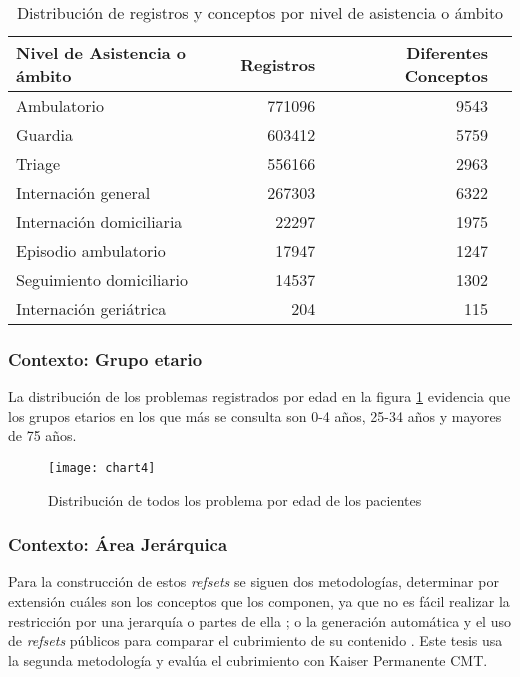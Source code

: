 \begin{table}[tb]
\centering
\caption{Distribución de registros y conceptos por nivel de asistencia o ámbito }
\label{nivel_asistencia}
\begin{tabular}{@{}lrrr@{}}
\toprule
Nivel de Asistencia o ámbito & Registros & Diferentes Conceptos \\ \midrule
Ambulatorio & \num{771096} & \num{9543} \\
Guardia & \num{603412} & \num{5759} \\
Triage & \num{556166} & \num{2963} \\
Internación general & \num{267303} & \num{6322} \\
Internación domiciliaria & \num{22297} & \num{1975}\\
Episodio ambulatorio & \num{17947} & \num{1247} \\
Seguimiento domiciliario & \num{14537} & \num{1302} \\
Internación geriátrica & \num{204} & \num{115} \\ \bottomrule
\end{tabular}
\end{table}

\subsubsection{Contexto: Grupo etario}
La distribución de los problemas registrados por edad en la figura \ref{fig:listaEdad} evidencia que los grupos etarios en los que más se consulta son 0-4 años, 25-34 años y mayores de 75 años.

\begin{figure}[t]
\caption{Distribución de todos los problema por edad de los pacientes}
\label{fig:listaEdad}
\centering
\texttt{[image: chart4]}
\end{figure}

\subsubsection{Contexto: Área Jerárquica}

Para la construcción de estos \textit{refsets} se siguen dos metodologías, determinar por extensión cuáles son los conceptos que los componen, ya que no es fácil realizar la restricción por una jerarquía o partes de ella \cite{Hjen2014MethodsSets.,Lee2013AImplementations.}; o la generación automática y el uso de \textit{refsets} públicos para comparar el cubrimiento de su contenido \cite{Lee2013AImplementations.}. Este tesis usa la segunda metodología y evalúa el cubrimiento con Kaiser Permanente CMT.

